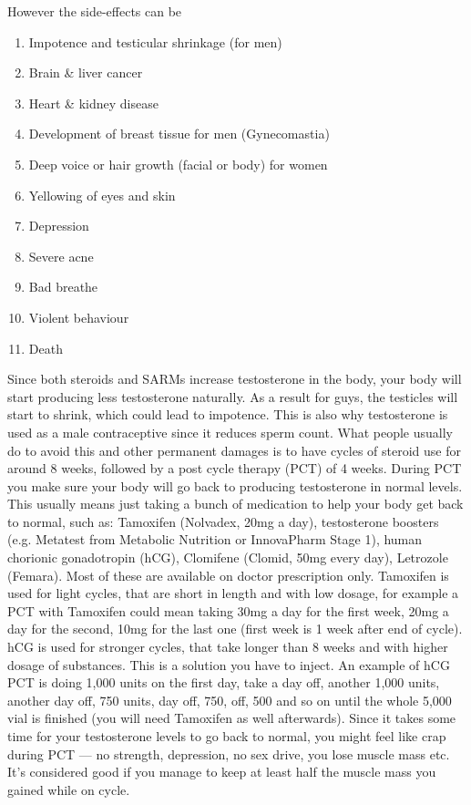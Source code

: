 \documentclass[openany, 12pt]{book}
\begin{document}
        However the side-effects can be

	\begin{enumerate}
		\item Impotence and testicular shrinkage (for men)
		\item Brain \& liver cancer
		\item Heart \& kidney disease
		\item Development of breast tissue for men (Gynecomastia)
		\item Deep voice or hair growth (facial or body) for women
		\item Yellowing of eyes and skin
		\item Depression
		\item Severe acne
		\item Bad breathe
		\item Violent behaviour
		\item Death
	\end{enumerate}

        Since both steroids and SARMs increase testosterone in the body, your body will start producing less testosterone naturally. As a result for guys, the testicles will start to shrink, which could
        lead to impotence. This is also why testosterone is used as a male contraceptive since it reduces sperm count.
        What people usually do to avoid this and other permanent damages is to have cycles of steroid use for around 8 weeks, followed by a post cycle therapy (PCT)
        of 4 weeks. During PCT you make sure your body will go back to producing testosterone in normal levels. This usually means just taking a bunch of medication to help your body get back
        to normal, such as: Tamoxifen (Nolvadex, 20mg a day), testosterone boosters (e.g. Metatest from Metabolic Nutrition or InnovaPharm Stage 1), human chorionic gonadotropin (hCG),
        Clomifene (Clomid, 50mg every day), Letrozole (Femara). Most of these are available on doctor prescription only. Tamoxifen is used for light cycles, that are short in length and with low
        dosage, for example a PCT with Tamoxifen could mean taking 30mg a day for the first week, 20mg a day for the second, 10mg for the last one (first week is 1 week after end of cycle).
        hCG is used for stronger cycles, that take longer than 8 weeks and with higher dosage of substances. This is a solution you have to inject. An example of hCG PCT is doing 1,000 units
        on the first day, take a day off, another 1,000 units, another day off, 750 units, day off, 750, off, 500 and so on until the whole 5,000 vial is finished (you will need
        Tamoxifen as well afterwards).
        Since it takes some time for your testosterone levels to go back to normal, you might feel like crap during PCT --- no strength, depression,
        no sex drive, you lose muscle mass etc. It's considered good if you manage to keep at least half the muscle mass you gained while on cycle.
        
\end{document}
